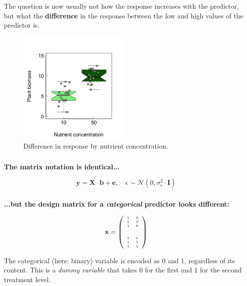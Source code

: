 \documentclass{beamer}
\begin{document}
\begin{frame}
  \frametitle{}
  The question is now usually not how the response increases with the predictor, but what the \textbf{difference} in the response between the low and high values of the predictor is.
  
  \begin{figure}[h]
    \centering
    \includegraphics[width=0.5\textwidth]{lectures/day_3_LM_refresh_II/figures/unnamed-chunk-9-1.png} 
    \caption{Difference in response by nutrient concentration.}
  \end{figure}
\end{frame}

\begin{frame}
  \frametitle{}
  \textbf{The matrix notation is identical...}

  \begin{equation*}
  \mathbf{y} = \mathbf{X} \cdot \mathbf{b} + \mathbf{e}, \quad \epsilon \sim \mathcal{N}(0, \sigma^2_{\epsilon} \cdot \mathbf{I})
  \end{equation*}
\end{frame}

\begin{frame}
  \frametitle{}
  \textbf{...but the design matrix for a \textit{categorical} predictor looks different:}

  \begin{equation*}
  \tiny {\mathbf{x} = \left( \begin{array}{cc} 1 & 0 \\ 1 & 0 \\ 1 & 0 \\ . & . \\ . & . \\ 1 & 1 \\ 1 & 1 \\ 1 & 1 \end{array}\right) }
  \end{equation*}
  
  The categorical (here: binary) variable is encoded as 0 and 1, regardless of its content. This is a \textit{dummy variable} that takes 0 for the first and 1 for the second treatment level.
\end{frame}
\end{document}
